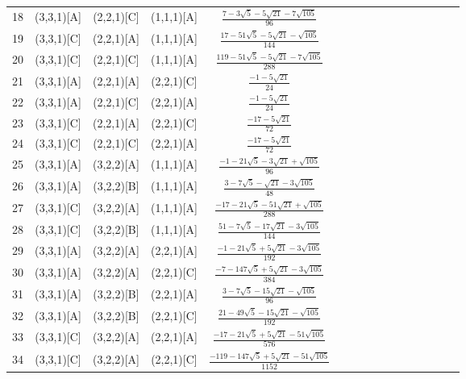 \documentclass[11pt]{article}
\begin{document}
\begin{longtable}{ | p{1cm}| *{15}{c|} }
18 & (3,3,1)[A] & (2,2,1)[C] & (1,1,1)[A] & $\frac{7-3\sqrt{5}-5\sqrt{21}-7\sqrt{105}}{96}$\\ %
19 & (3,3,1)[C] & (2,2,1)[A] & (1,1,1)[A] & $\frac{17-51\sqrt{5}-5\sqrt{21}-\sqrt{105}}{144}$\\ %
20 & (3,3,1)[C] & (2,2,1)[C] & (1,1,1)[A] & $\frac{119-51\sqrt{5}-5\sqrt{21}-7\sqrt{105}}{288}$\\ %
21 & (3,3,1)[A] & (2,2,1)[A] & (2,2,1)[C] & $\frac{-1-5\sqrt{21}}{24}$\\ %
22 & (3,3,1)[A] & (2,2,1)[C] & (2,2,1)[A] & $\frac{-1-5\sqrt{21}}{24}$\\ %
23 & (3,3,1)[C] & (2,2,1)[A] & (2,2,1)[C] & $\frac{-17-5\sqrt{21}}{72}$\\ %
24 & (3,3,1)[C] & (2,2,1)[C] & (2,2,1)[A] & $\frac{-17-5\sqrt{21}}{72}$\\ %
25 & (3,3,1)[A] & (3,2,2)[A] & (1,1,1)[A] & $\frac{-1-21\sqrt{5}-3\sqrt{21}+\sqrt{105}}{96}$\\ %
26 & (3,3,1)[A] & (3,2,2)[B] & (1,1,1)[A] & $\frac{3-7\sqrt{5}-\sqrt{21}-3\sqrt{105}}{48}$\\ %
27 & (3,3,1)[C] & (3,2,2)[A] & (1,1,1)[A] & $\frac{-17-21\sqrt{5}-51\sqrt{21}+\sqrt{105}}{288}$\\ %
28 & (3,3,1)[C] & (3,2,2)[B] & (1,1,1)[A] & $\frac{51-7\sqrt{5}-17\sqrt{21}-3\sqrt{105}}{144}$\\ %
29 & (3,3,1)[A] & (3,2,2)[A] & (2,2,1)[A] & $\frac{-1-21\sqrt{5}+5\sqrt{21}-3\sqrt{105}}{192}$\\ %
30 & (3,3,1)[A] & (3,2,2)[A] & (2,2,1)[C] & $\frac{-7-147\sqrt{5}+5\sqrt{21}-3\sqrt{105}}{384}$\\ %
31 & (3,3,1)[A] & (3,2,2)[B] & (2,2,1)[A] & $\frac{3-7\sqrt{5}-15\sqrt{21}-\sqrt{105}}{96}$\\ %
32 & (3,3,1)[A] & (3,2,2)[B] & (2,2,1)[C] & $\frac{21-49\sqrt{5}-15\sqrt{21}-\sqrt{105}}{192}$\\ %
33 & (3,3,1)[C] & (3,2,2)[A] & (2,2,1)[A] & $\frac{-17-21\sqrt{5}+5\sqrt{21}-51\sqrt{105}}{576}$\\ %
34 & (3,3,1)[C] & (3,2,2)[A] & (2,2,1)[C] & $\frac{-119-147\sqrt{5}+5\sqrt{21}-51\sqrt{105}}{1152}$\\ %

\end{longtable}
\end{document}
